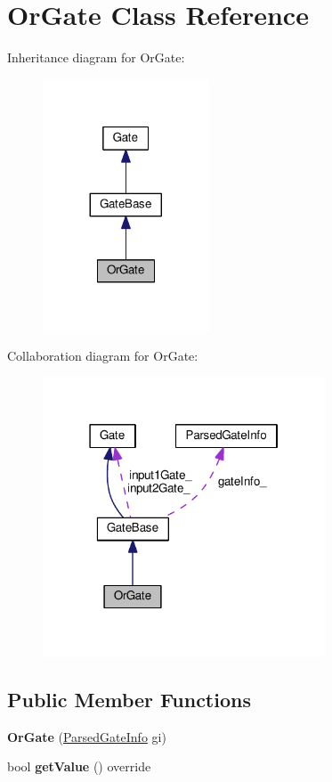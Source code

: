 \hypertarget{classOrGate}{}\section{Or\+Gate Class Reference}
\label{classOrGate}


Inheritance diagram for Or\+Gate\+:
\nopagebreak
\begin{figure}[H]
\begin{center}
\leavevmode
\includegraphics[width=140pt]{classOrGate__inherit__graph}
\end{center}
\end{figure}


Collaboration diagram for Or\+Gate\+:
\nopagebreak
\begin{figure}[H]
\begin{center}
\leavevmode
\includegraphics[width=238pt]{classOrGate__coll__graph}
\end{center}
\end{figure}
\subsection*{Public Member Functions}
\begin{DoxyCompactItemize}
\item 
{\bfseries Or\+Gate} (\hyperlink{structParsedGateInfo}{Parsed\+Gate\+Info} gi)\hypertarget{classOrGate_a10fdcd2d98fbc27ac5eec508eb7d0bad}{}\label{classOrGate_a10fdcd2d98fbc27ac5eec508eb7d0bad}

\item 
bool {\bfseries get\+Value} () override\hypertarget{classOrGate_aa012b2faf42b94a3e514402a798e2e7b}{}\label{classOrGate_aa012b2faf42b94a3e514402a798e2e7b}

\end{DoxyCompactItemize}
